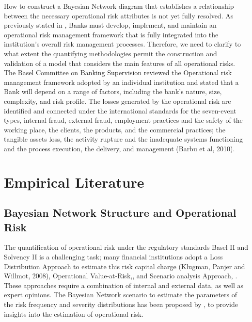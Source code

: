 How to construct a Bayesian Network diagram that establishes a relationship between the necessary operational risk attributes is not yet fully resolved. As previously stated in \textcite{basel2021principles}, Banks must develop, implement, and maintain an operational risk management framework that is fully integrated into the institution’s overall risk management processes. Therefore, we need to clarify to what extent the quantifying methodologies permit the construction and validation of a model that considers the main features of all operational risks. The Basel Committee on Banking Supervision reviewed the Operational risk management framework adopted by an individual institution and stated that a Bank will depend on a range of factors, including the bank’s nature, size, complexity, and risk profile. The losses generated by the operational risk are identified and connected under the international standards for the seven-event types, internal fraud, external fraud, employment practices and the safety of the working place, the clients, the products, and the commercial practices; the tangible assets loss, the activity rupture and the inadequate systems functioning and the process execution, the delivery, and management  (Barbu et al, 2010). 

\section{Empirical Literature}
\subsection{Bayesian Network Structure and Operational Risk }

The quantification of operational risk under the regulatory standards Basel II and Solvency II is a challenging task; many financial institutions adopt a Loss Distribution Approach to estimate this risk capital charge (Klugman, Panjer and Willmot, 2008), Operational Value-at-Risk,\textcite{sanford_operational_2015}, and Scenario analysis Approach, \textcite{andersen2016causal}. These approaches require a combination of internal and external data, as well as expert opinions. The Bayesian Network scenario to estimate the parameters of the risk frequency and severity distributions has been proposed by \parencite{aquaro_bayesian_2009}, to provide insights into the estimation of operational risk.


